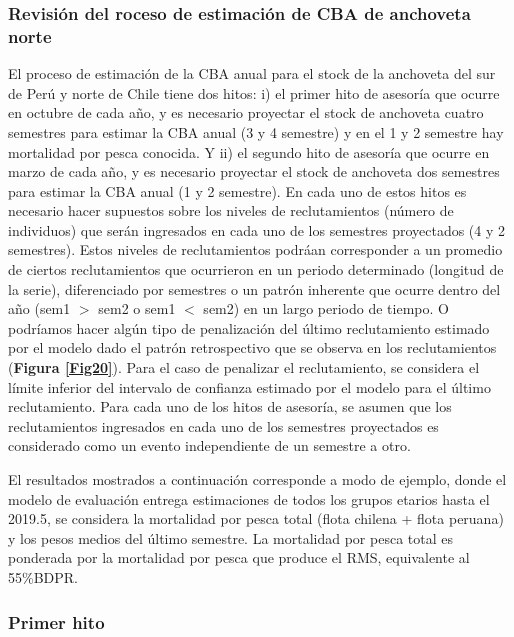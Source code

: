 \documentclass[letter,11pt]{article}
\begin{document}
\subsubsection{Revisi\'on del roceso de estimaci\'on de CBA de anchoveta norte}

\quad

El proceso de estimaci\'on de la CBA anual para el stock de la anchoveta
del sur de Per\'u y norte de Chile tiene dos hitos: i) el primer hito de
asesor\'ia que ocurre en octubre de cada a\~{n}o, y es necesario proyectar el
stock de anchoveta cuatro semestres para estimar la CBA anual (3 y 4
semestre) y en el 1 y 2 semestre hay mortalidad por pesca conocida. 
Y ii) el segundo hito de asesor\'ia que ocurre en marzo de cada
a\~{n}o, y es necesario proyectar el stock de anchoveta dos semestres para
estimar la CBA anual (1 y 2 semestre). En cada uno de estos hitos es
necesario hacer supuestos sobre los niveles de reclutamientos (n\'umero de
individuos) que ser\'an ingresados en cada uno de los semestres
proyectados (4 y 2 semestres). Estos niveles de reclutamientos podr\'aan
corresponder a un promedio de ciertos reclutamientos que ocurrieron en
un periodo determinado (longitud de la serie), diferenciado por
semestres o un patr\'on inherente que ocurre dentro del a\~{n}o (sem1 $>$
sem2 o sem1 $<$ sem2) en un largo periodo de tiempo. O podr\'iamos hacer
alg\'un tipo de penalizaci\'on del \'ultimo reclutamiento estimado por el
modelo dado el patr\'on retrospectivo que se observa en los reclutamientos
(\textbf{Figura \ref{Fig20}}). Para el caso de penalizar el reclutamiento,
se considera el l\'imite inferior del intervalo de confianza estimado
por el modelo para el \'ultimo reclutamiento. Para cada uno de los
hitos de asesor\'ia, se asumen que los reclutamientos ingresados
en cada uno de los semestres proyectados es considerado como un evento
independiente de un semestre a otro.

El resultados mostrados a continuaci\'on corresponde a modo de ejemplo,
donde el modelo de evaluaci\'on entrega estimaciones de todos los grupos
etarios hasta el 2019.5, se considera la mortalidad por pesca total
(flota chilena + flota peruana) y los pesos medios del \'ultimo semestre.
La mortalidad por pesca total es ponderada por la mortalidad por pesca
que produce el RMS, equivalente al 55\%BDPR.


\subsubsection{Primer hito}
\end{document}
